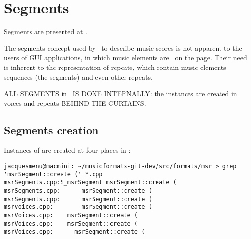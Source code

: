 



\chapter{Segments}\label{Segments}

Segments are presented at .

The segments concept used by \mf\ to describe music scores is not apparent to the users of GUI applications, in which music elements are \drawn\ on the page.
Their need is inherent to the representation of repeats, which contain music elements sequences (the segments) and even other repeats.

\MakeUppercase{All segments} in \mf\ \MakeUppercase{is done internally}: the  instances are created in voices and repeats \MakeUppercase{behind the curtains}.


\section{Segments creation}\label{Segments creation}

Instances of  are created at four places in :
\begin{lstlisting}[language=Terminal]
jacquesmenu@macmini: ~/musicformats-git-dev/src/formats/msr > grep 'msrSegment::create (' *.cpp
msrSegments.cpp:S_msrSegment msrSegment::create (
msrSegments.cpp:      msrSegment::create (
msrSegments.cpp:      msrSegment::create (
msrVoices.cpp:        msrSegment::create (
msrVoices.cpp:    msrSegment::create (
msrVoices.cpp:    msrSegment::create (
msrVoices.cpp:      msrSegment::create (
\end{lstlisting}

